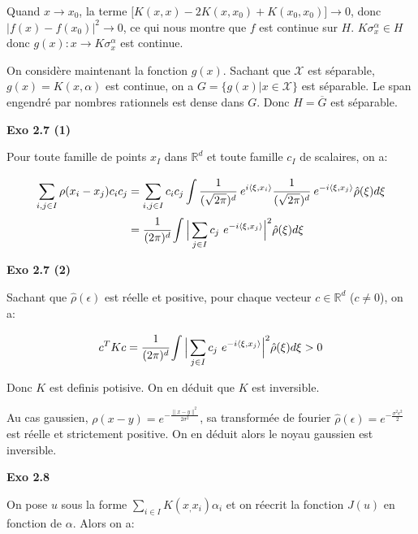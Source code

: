 \documentclass[11pt]{article}
\begin{document}
    Quand $x \to x_0$, la terme $\big[K(x, x) - 2 K(x, x_0) + K(x_0, x_0) \big] \to 0$, donc $|f(x) - f(x_0)|^2 \to 0$, ce qui nous montre que $f$ est continue sur $H$.
    $K\sigma_x^\alpha \in H$ donc $g(x): x \to K\sigma_x^\alpha$ est continue.

    On considère maintenant la fonction $g(x)$. Sachant que $\mathcal{X}$ est séparable, $g(x) = K(x, \alpha)$ est continue, on a $G = \{g(x)| x \in \mathcal{X}\}$ est séparable.
    Le span engendré par nombres rationnels est dense dans $G$. Donc $H = \overline{G}$ est séparable.

    \textbf{Exo 2.7 (1)} 

    Pour toute famille de points $x_I$ dans $\mathbb{R}^d$ et toute famille $c_I$ de scalaires, on a:

    \vspace{-4em}
    \begin{align*}
      \sum_{i,j\in I} \rho (x_i - x_j)c_i c_j &= \sum_{i,j \in I} c_i c_j \int \cfrac{1}{(\sqrt{2\pi})^d}\ e^{i \left \langle \xi, x_i \right \rangle} \cfrac{1}{(\sqrt{2\pi})^d}\ e^{-i \left \langle \xi, x_j \right \rangle} \hat{\rho} (\xi) d \xi \\
      &= \cfrac{1}{(2 \pi)^d} \int \Big |\sum_{j \in I} c_j\ e^{-i \left \langle \xi, x_j \right \rangle} \Big|^2 \hat{\rho} (\xi) d \xi
    \end{align*}
    \vspace{-4em}

    \textbf{Exo 2.7 (2)} 

    Sachant que $\hat{\rho}(\epsilon)$ est réelle et positive, pour chaque vecteur $c \in \mathbb{R}^d$ ($c \neq 0$), on a:
    
    \vspace{-2em}
    $$c^T K c = \cfrac{1}{(2 \pi)^d} \int \Big |\sum_{j \in I} c_j\ e^{-i \left \langle \xi, x_j \right \rangle} \Big|^2 \hat{\rho} (\xi) d \xi > 0$$
    \vspace{-2em}

    Donc $K$ est definis potisive. On en déduit que $K$ est inversible. 

    Au cas gaussien, $\rho(x-y) = e^{-\frac{\|x-y\|^2}{2\sigma^2}}$, sa transformée de fourier $\hat{\rho}(\epsilon) = e^{-\frac{\sigma^2 \epsilon^2}{2}}$ est réelle et strictement positive.
    On en déduit alors le noyau gaussien est inversible.

    \textbf{Exo 2.8}

    On pose $u$ sous la forme $\sum_{i \in I} K(x_, x_i) \alpha_i$ et on réecrit la fonction $J(u)$ en fonction de $\alpha$. Alors on a:
\end{document}
